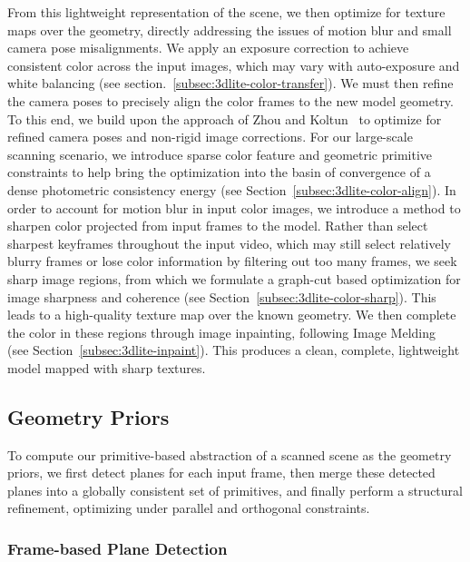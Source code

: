 From this lightweight representation of the scene, we then optimize for texture maps over the geometry, directly addressing the issues of motion blur and small camera pose misalignments.
We apply an exposure correction to achieve consistent color across the input images, which may vary with auto-exposure and white balancing (see section.~\ref{subsec:3dlite-color-transfer}).
We must then refine the camera poses to precisely align the color frames to the new model geometry.
To this end, we build upon the approach of Zhou and Koltun~\cite{zhou2014color} to optimize for refined camera poses and non-rigid image corrections.
For our large-scale scanning scenario, we introduce sparse color feature and geometric primitive constraints to help bring the optimization into the basin of convergence of a dense photometric consistency energy (see Section~\ref{subsec:3dlite-color-align}).
In order to account for motion blur in input color images, we introduce a method to sharpen color projected from input frames to the model.
Rather than select sharpest keyframes throughout the input video, which may still select relatively blurry frames or lose color information by filtering out too many frames, we seek sharp image regions, from which we formulate a graph-cut based optimization for image sharpness and coherence (see Section~\ref{subsec:3dlite-color-sharp}). 
This leads to a high-quality texture map over the known geometry.
We then complete the color in these regions through image inpainting, following  Image Melding~\cite{darabi2012image} (see Section~\ref{subsec:3dlite-inpaint}).
This produces a clean, complete, lightweight model mapped with sharp textures.

\subsection{Geometry Priors}
\label{sec:3dlite-plane-abstraction}
To compute our primitive-based abstraction of a scanned scene as the geometry priors, we first detect planes for each input frame, then merge these detected planes into a globally consistent set of primitives, and finally perform a structural refinement, optimizing under parallel and orthogonal constraints.

\subsubsection{Frame-based Plane Detection}
\label{subsec:3dlite-plane-detect}

